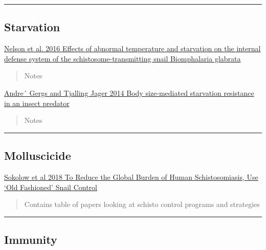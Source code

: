 \documentclass[10,portrait]{article}
\begin{document}
\newpage  

\begin{center}\rule{0.5\linewidth}{\linethickness}\end{center}

\subsection{Starvation}\label{starvation}

\href{https://www.ncbi.nlm.nih.gov/pmc/articles/PMC4945359/}{Nelson et
al. 2016 Effects of abnormal temperature and starvation on the internal
defense system of the schistosome-transmitting snail Biomphalaria
glabrata}

\begin{quote}
Notes
\end{quote}

\href{https://besjournals.onlinelibrary.wiley.com/doi/pdf/10.1111/1365-2656.12195}{Andre´
Gergs and Tjalling Jager 2014 Body size-mediated starvation resistance
in an insect predator}

\begin{quote}
Notes
\end{quote}

\newpage  

\begin{center}\rule{0.5\linewidth}{\linethickness}\end{center}

\subsection{Molluscicide}\label{molluscicide}

\href{}{Sokolow et al 2018 To Reduce the Global Burden of Human
Schistosomiasis, Use `Old Fashioned' Snail Control}

\begin{quote}
Contains table of papers looking at schisto control programs and
strategies
\end{quote}

\newpage  

\begin{center}\rule{0.5\linewidth}{\linethickness}\end{center}

\subsection{Immunity}\label{immunity}
\end{document}
